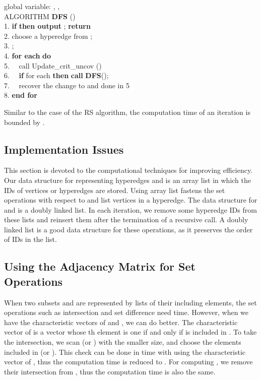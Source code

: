 \begin{tabbing}
global variable: , , \\
ALGORITHM {\bf DFS} ()\\
1. {\bf if}  {\bf then output}  ; {\bf return}\\
2. choose a hyperedge  from ;\\
3. ; \\
4. {\bf for each}  {\bf do}\\
5. \ \ call Update\_crit\_uncov ()\\
6. \ \ {\bf if}  for each  {\bf then}
 {\bf call} {\bf DFS}(); \\
7. \ \ recover the change to  and  done in 5\\
8. {\bf end for}
\end{tabbing}

Similar to the case of the RS algorithm, the computation time of an
 iteration is bounded by .

\subsection{Implementation Issues }

This section is devoted to the computational techniques for improving
 efficiency.
Our data structure for representing hyperedges and  is an
 array list in which the IDs of vertices or hyperedges are stored.
Using array list fastens the set operations with respect to 
 and list vertices in a hyperedge.
The data structure for  and  is a doubly linked list.
In each iteration, we remove some hyperedge IDs from these lists and
 reinsert them after the termination of a recursive call.
A doubly linked list is a good data structure for these operations, 
 as it preserves the order of IDs in the list.

\subsection{Using the Adjacency Matrix for Set Operations}

When two subsets  and  are represented by lists of their including
 elements, the set operations such as intersection and set difference need
  time.
However, when we have the characteristic vectors of  and , we can
 do better.
The characteristic vector of  is a vector whose th element is one if
 and only if  is included in .
To take the intersection, we scan  (or ) with the smaller size,
 and choose the elements included in  (or ).
This check can be done in  time with using the characteristic vector
 of , thus the computation time is reduced to .
For computing , we remove their intersection from ,
 thus the computation time is also the same.

